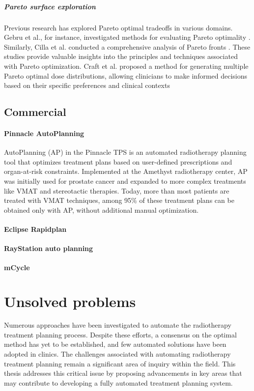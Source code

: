 \subparagraph{Pareto surface exploration}
Previous research has explored Pareto optimal tradeoffs in various domains.
Gebru et al., for instance, investigated methods for evaluating Pareto optimality \cite{Gebru2023}.
Similarly, Cilla et al. conducted a comprehensive analysis of Pareto fronts \cite{Cilla2018}.
These studies provide valuable insights into the principles and techniques associated with Pareto optimization.
Craft et al. proposed a method for generating multiple Pareto optimal dose distributions, allowing clinicians to make informed decisions based on their specific preferences and clinical contexts \cite{Craft2007}

\subsection{Commercial}
\paragraph{Pinnacle AutoPlanning}
AutoPlanning (AP) in the Pinnacle TPS is an automated radiotherapy planning tool that optimizes treatment plans based on user-defined prescriptions and organ-at-risk constraints.
Implemented at the Amethyst radiotherapy center, AP was initially used for prostate cancer and expanded to more complex treatments like VMAT and stereotactic therapies.
Today, more than most patients are treated with VMAT techniques, among 95\% of these treatment plans can be obtained only with AP, without additional manual optimization.

\paragraph{Eclipse Rapidplan}
\paragraph{RayStation auto planning }
\paragraph{mCycle}

\section{Unsolved problems}
Numerous approaches have been investigated to automate the radiotherapy treatment planning process.
Despite these efforts, a consensus on the optimal method has yet to be established, and few automated solutions have been adopted in clinics.
The challenges associated with automating radiotherapy treatment planning remain a significant area of inquiry within the field.
This thesis addresses this critical issue by proposing advancements in key areas that may contribute to developing a fully automated treatment planning system.

